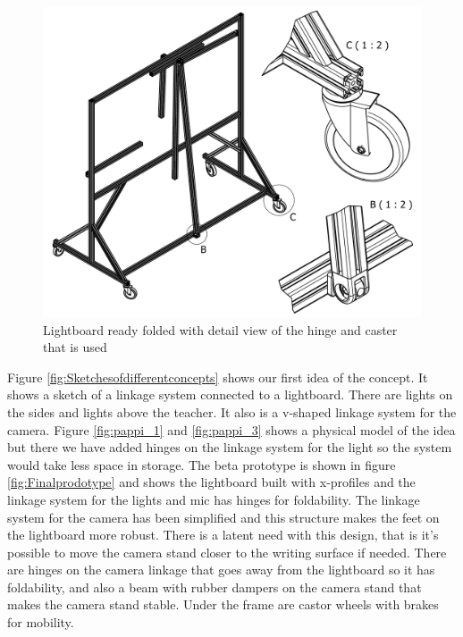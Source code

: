 \documentclass[a4paper]{jpconf}
\begin{document}
	\begin{figure}
		\centering
		\includegraphics[width=1\linewidth]{frame2.pdf}
		\caption{Lightboard ready folded with detail view of the hinge and caster that is used}
		\label{fig:Finalprodotype2}
	\end{figure}
	
	
	
	
	
	
	Figure \ref{fig:Sketchesofdifferentconcepts} shows our first idea of the concept.  It shows a sketch of a linkage system connected to a lightboard.
	There are lights on the sides and lights above the teacher.
	It also is a v-shaped linkage system for the camera.
	Figure \ref{fig:pappi_1} and \ref{fig:pappi_3} shows a physical model of the idea but there we have added hinges on the linkage system for the light so the system would take less space in storage.
	The beta prototype is shown in figure \ref{fig:Finalprodotype} and shows the lightboard built with x-profiles and the linkage system for the lights and mic has hinges for foldability.
	The linkage system for the camera has been simplified and this structure makes the feet on the lightboard more robust. There is a latent need with this design, that is it's possible to move the camera stand closer to the writing surface if needed.
	There are hinges on the camera linkage that goes away from the lightboard so it has foldability, and also a beam with rubber dampers on the camera stand that makes the camera stand stable.
	Under the frame are castor wheels with brakes for mobility.
	
\end{document}
